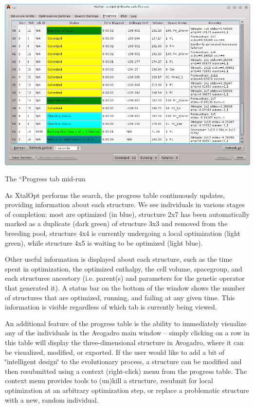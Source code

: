 \begin{DoxyImage}
\includegraphics[width=\textwidth]{prog-mon.png}
\caption{The ``\+Progress\textquotesingle{}\textquotesingle{} tab mid-\/run}
\end{DoxyImage}


As Xtal\+Opt performs the search, the progress table continuously updates, providing information about each structure. We see individuals in various stages of completion\+: most are optimized (in blue), structure 2x7 has been automatically marked as a duplicate (dark green) of structure 3x3 and removed from the breeding pool, structure 4x4 is currently undergoing a local optimization (light green), while structure 4x5 is waiting to be optimized (light blue).

Other useful information is displayed about each structure, such as the time spent in optimization, the optimized enthalpy, the cell volume, spacegroup, and each structure\textquotesingle{}s ancestory (i.\+e. parent(s) and parameters for the genetic operator that generated it). A status bar on the bottom of the window shows the number of structures that are optimized, running, and failing at any given time. This information is visible regardless of which tab is currently being viewed.

An additional feature of the progress table is the ability to immediately visualize any of the individuals in the Avogadro main window -- simply clicking on a row in this table will display the three-\/dimensional structure in Avogadro, where it can be visualized, modified, or exported. If the user would like to add a bit of \char`\"{}intelligent design\char`\"{} to the evolutionary process, a structure can be modified and then resubmitted using a context (right-\/click) menu from the progress table. The context menu provides tools to (un)kill a structure, resubmit for local optimization at an arbitrary optimization step, or replace a problematic structure with a new, random individual.

